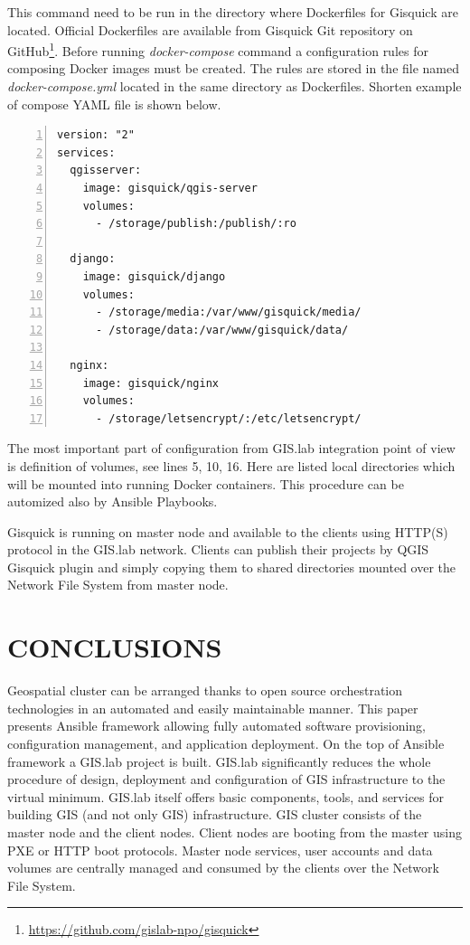 \documentclass{isprs}
\begin{document}
This command need to be run in the directory where Dockerfiles for
Gisquick are located. Official Dockerfiles are available from Gisquick
Git repository on
GitHub\footnote{\url{https://github.com/gislab-npo/gisquick}}. Before
running \textit{docker-compose} command a configuration rules for
composing Docker images must be created. The rules are stored in the
file named \textit{docker-compose.yml} located in the same directory
as Dockerfiles. Shorten example of compose YAML file is shown below.

\begin{lstlisting}[numbers=left,xleftmargin=1em]
version: "2"
services:
  qgisserver:
    image: gisquick/qgis-server
    volumes:
      - /storage/publish:/publish/:ro

  django:
    image: gisquick/django
    volumes:
      - /storage/media:/var/www/gisquick/media/
      - /storage/data:/var/www/gisquick/data/

  nginx:
    image: gisquick/nginx
    volumes:
      - /storage/letsencrypt/:/etc/letsencrypt/
\end{lstlisting}

The most important part of configuration from GIS.lab integration
point of view is definition of volumes, see lines 5, 10, 16. Here are
listed local directories which will be mounted into running Docker
containers. This procedure can be automized also by Ansible Playbooks.

Gisquick is running on master node and available to the clients using
HTTP(S) protocol in the GIS.lab network. Clients can publish their
projects by QGIS Gisquick plugin and simply copying them to shared
directories mounted over the Network File System from master node.

\section{CONCLUSIONS}

Geospatial cluster can be arranged thanks to open source orchestration
technologies in an automated and easily maintainable manner. This
paper presents Ansible framework allowing fully automated software
provisioning, configuration management, and application deployment. On
the top of Ansible framework a GIS.lab project is built. GIS.lab
significantly reduces the whole procedure of design, deployment and
configuration of GIS infrastructure to the virtual minimum. GIS.lab
itself offers basic components, tools, and services for building GIS
(and not only GIS) infrastructure. GIS cluster consists of the master
node and the client nodes. Client nodes are booting from the master
using PXE or HTTP boot protocols. Master node services, user accounts
and data volumes are centrally managed and consumed by the clients
over the Network File System.
\end{document}

